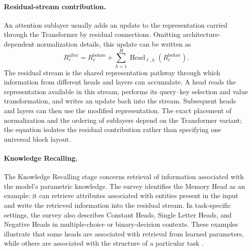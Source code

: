 \paragraph{Residual-stream contribution.}
An attention sublayer usually adds an update to the representation
carried through the Transformer by residual connections. Omitting
architecture-dependent normalization details, this update can be written as
\begin{equation}
    R_{\ell}^{\mathrm{after}}
    =
    R_{\ell}^{\mathrm{before}}
    +
    \sum_{h=1}^{H}\operatorname{Head}_{\ell,h}(R_{\ell}^{\mathrm{before}}).
    \label{eq:attn-residual-stream}
\end{equation}
The residual stream is the shared representation pathway through which
information from different heads and layers can accumulate. A head reads
the representation available in this stream, performs its query--key
selection and value transformation, and writes an update back into the
stream. Subsequent heads and layers can then use the modified
representation. The exact placement of normalization and the ordering of
sublayers depend on the Transformer variant; the equation isolates the
residual contribution rather than specifying one universal block layout.

\paragraph{Knowledge Recalling.}
The Knowledge Recalling stage concerns retrieval of information associated
with the model's parametric knowledge. The survey identifies the Memory
Head as an example: it can retrieve attributes associated with entities
present in the input and write the retrieved information into the residual
stream. In task-specific settings, the survey also describes Constant
Heads, Single Letter Heads, and Negative Heads in multiple-choice or
binary-decision contexts. These examples illustrate that some heads are
associated with retrieval from learned parameters, while others are
associated with the structure of a particular task
\parencite{zheng2024attentionheads}.

